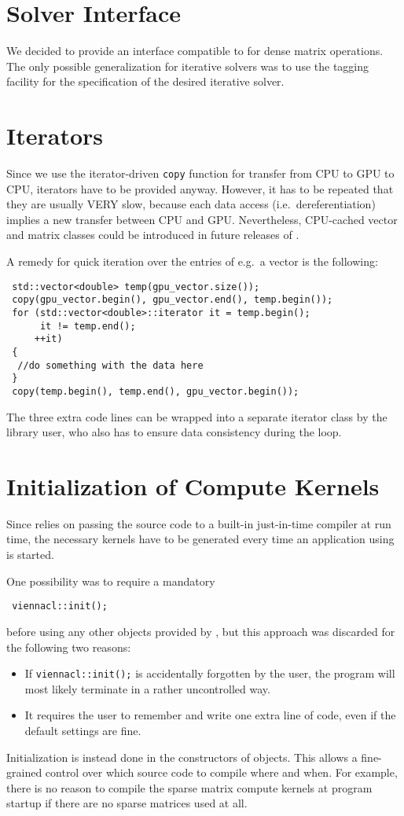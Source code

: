 \section{Solver Interface}
We decided to provide an interface compatible to {\ublas} for dense matrix
operations. The only possible generalization for iterative solvers was to use
the tagging facility for the specification of the desired iterative solver.

\section{Iterators}
Since we use the iterator-driven \lstinline|copy| function for transfer from
CPU to GPU to CPU, iterators have to be provided anyway. However, it has to be repeated
that they are usually VERY slow, because each data access (i.e.~dereferentiation) implies a new
transfer between CPU and GPU. Nevertheless, CPU-cached vector and matrix
classes could be introduced in future releases of {\ViennaCL}.

A remedy for quick iteration over the entries of e.g.~a vector is the following:
\begin{lstlisting}
 std::vector<double> temp(gpu_vector.size());
 copy(gpu_vector.begin(), gpu_vector.end(), temp.begin());  
 for (std::vector<double>::iterator it = temp.begin();
      it != temp.end();
     ++it)
 {
  //do something with the data here
 }
 copy(temp.begin(), temp.end(), gpu_vector.begin());
\end{lstlisting}
The three extra code lines can be wrapped into a separate iterator class by the library user, who also has to ensure data consistency during the loop.


\section{Initialization of Compute Kernels}
Since {\OpenCL} relies on passing the {\OpenCL} source code to a
built-in just-in-time compiler at run time, the necessary kernels have to be generated every
time an application using {\ViennaCL} is started.

One possibility was to require a mandatory
\begin{lstlisting}
 viennacl::init();
\end{lstlisting}
before using any other objects provided by {\ViennaCL}, but this approach was discarded for the following two reasons:
\begin{itemize}
 \item If \lstinline|viennacl::init();| is accidentally forgotten by the user,
the program will most likely terminate in a rather uncontrolled way. 
 \item It requires the user to remember and write one extra line of code, even
if the default settings are fine.
\end{itemize}
Initialization is instead done in the constructors of {\ViennaCL}
objects. This allows a fine-grained control over which source code to compile
where and when. For example, there is no reason to compile the sparse matrix
compute kernels at program startup if there are no sparse matrices used at all.

